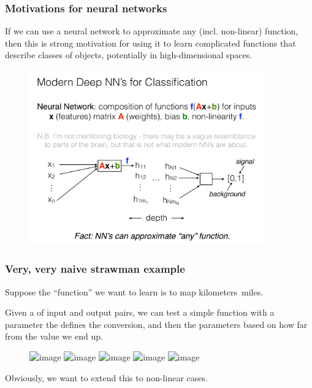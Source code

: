 \documentclass[hyperref={colorlinks=true}]{beamer}
\begin{document}
\begin{frame}%
  \frametitle{Motivations for neural networks}

  If we can use a neural network to approximate any (incl. non-linear) function, then this is strong motivation for using it to learn complicated functions that describe classes of objects, potentially in high-dimensional spaces.

  \begin{figure}
    \centering
    \includegraphics[width=0.9\textwidth]{SimpleNeuralNetwork.pdf}
  \end{figure}
  
  
\end{frame}


\begin{frame}%
  \frametitle{Very, very naive strawman example}

  Suppose the ``function'' we want to learn is to map kilometers\ra\ miles. 
  
  \mysp
  
  Given a  of input and output pairs, we can test a simple function with a parameter the defines the conversion, and then  the parameters based on how far from the  value we end up.

  \begin{figure}
    \centering
    \includegraphics<1>[width=0.7\textwidth]{km-to-mi-1.png}%
    \includegraphics<2>[width=0.8\textwidth]{km-to-mi-2.png}%
    \includegraphics<3>[width=0.8\textwidth]{km-to-mi-3.png}%
    \includegraphics<4>[width=0.8\textwidth]{km-to-mi-4.png}%
    \includegraphics<5>[width=0.8\textwidth]{km-to-mi-5.png}%
\end{figure}
  
  Obviously, we want to extend this to non-linear cases.
  
\end{frame}
\end{document}
